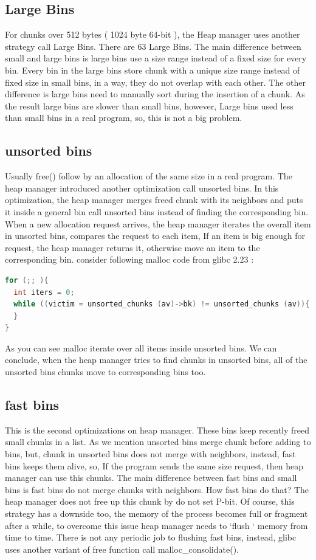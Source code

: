\documentclass{masterthesis}
\newcommand*\libc{glibc}
\newcommand*\fb{fast bins}
\newcommand*\ub{unsorted bins}
\begin{document}
\subsection{Large Bins}
For chunks over 512 bytes ( 1024 byte 64-bit ), the Heap manager uses another strategy call Large Bins. There are 63 Large Bins. The main difference between small and large bins is large bins use a size range instead of a fixed size for every bin. Every bin in the large bins store chunk with a unique size range instead of fixed size in small bins, in a way, they do not overlap with each other.
The other difference is large bins need to manually sort during the insertion of a chunk. As the result large bins are slower than small bins, however, Large bins used less than small bins in a real program, so, this is not a big problem.

\subsection{\ub{}}
Usually free() follow by an allocation of the same size in a real program. The heap manager introduced another optimization call \ub{}. In this optimization, the heap manager merges freed chunk with its neighbors and puts it inside a general bin call \ub{} instead of finding the corresponding bin. When a new allocation request arrives, the heap manager iterates the overall item in \ub{}, compares the request to each item, If an item is big enough for request, the heap manager returns it, otherwise move an item to the corresponding bin. consider following malloc code from \libc{} 2.23 :
\begin{lstlisting}[language=c,frame=tlrb]
for (;; ){
  int iters = 0;
  while ((victim = unsorted_chunks (av)->bk) != unsorted_chunks (av)){
  }
}
\end{lstlisting}
As you can see malloc iterate over all items inside \ub{}. We can conclude, when the heap manager tries to find chunks in unsorted bins, all of the unsorted bins chunks move to corresponding bins too.

\subsection{\fb{}}
This is the second optimizations on heap manager. These bins keep recently freed small chunks in a list. As we mention \ub{} merge chunk before adding to bins, but, chunk in \ub{} does not merge with neighbors, instead, \fb{} keeps them alive, so, If the program sends the same size request, then heap manager can use this chunks.
The main difference between \fb{} and small bins is \fb{} do not merge chunks with neighbors. How \fb{} do that? The heap manager does not free up this chunk by do not set P-bit. Of course, this strategy has a downside too, the memory of the process becomes full or fragment after a while, to overcome this issue heap manager needs to ‘flush ‘ memory from time to time. There is not any periodic job to flushing \fb{}, instead, \libc{} uses another variant of free function call malloc\_consolidate(). 
\end{document}
